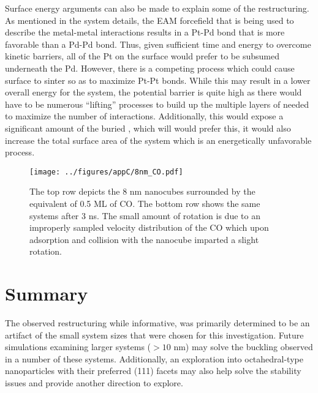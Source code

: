 Surface energy arguments can also be made to explain some of the restructuring.
As mentioned in the system details, the EAM forcefield that is being used to
describe the metal-metal interactions results in a Pt-Pd bond that is more
favorable than a Pd-Pd bond.  Thus, given sufficient time and energy to
overcome kinetic barriers, all of the Pt on the surface would prefer to be
subsumed underneath the Pd. However, there is a competing process which could
cause surface  to sinter so as to maximize Pt-Pt bonds. While this may
result in a lower overall energy for the system, the potential barrier is quite
high as there would have to be numerous ``lifting'' processes to build up the
multiple layers of  needed to maximize the number of 
interactions. Additionally, this would expose a significant amount of the
buried , which will  would prefer this, it would also increase
the total surface area of the system which is an energetically unfavorable
process.


\begin{landscape}
\begin{figure}[p!]
\centering
  \texttt{[image: ../figures/appC/8nm\_CO.pdf]}
  \caption{The top row depicts the 8 nm nanocubes surrounded by the equivalent
of 0.5 ML of CO. The bottom row shows the same systems after 3 ns.  The small
amount of rotation is due to an improperly sampled velocity distribution of the
CO which upon adsorption and collision with the nanocube imparted a slight
rotation.}
  \label{fig:8nmCO}
\end{figure}
\end{landscape}



\section{Summary}
The observed restructuring while informative, was primarily determined to be an
artifact of the small system sizes that were chosen for this investigation.
Future simulations examining larger systems ($>10$ nm) may solve the buckling
observed in a number of these systems. Additionally, an exploration into
octahedral-type nanoparticles with their preferred (111) facets may also help
solve the stability issues and provide another direction to explore.
